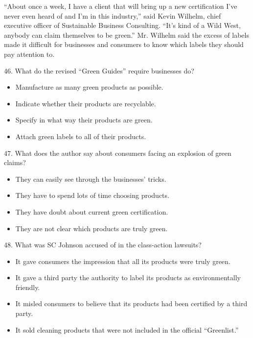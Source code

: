 \documentclass[UTF8,11pt]{ctexart}
\begin{document}
“About once a week, I have a client that will bring up a new certification I’ve never even heard of and I’m in this industry,” said Kevin Wilhelm, chief executive officer of Sustainable Business Consulting. “It’s kind of a Wild West, anybody can claim themselves to be green.” Mr. Wilhelm said the excess of labels made it difficult for businesses and consumers to know which labels they should pay attention to.


46. What do the revised “Green Guides” require businesses do?


\begin{itemize}[leftmargin=2em,itemsep=.2em,topsep=.4em]\item[A.] Manufacture as many green products as possible.
\item[B.] Indicate whether their products are recyclable.
\item[C.] Specify in what way their products are green.
\item[D.] Attach green labels to all of their products.
\end{itemize}

47. What does the author say about consumers facing an explosion of green claims?


\begin{itemize}[leftmargin=2em,itemsep=.2em,topsep=.4em]\item[A.] They can easily see through the businesses’ tricks.
\item[B.] They have to spend lots of time choosing products.
\item[C.] They have doubt about current green certification.
\item[D.] They are not clear which products are truly green.
\end{itemize}

48. What was SC Johnson accused of in the class-action lawsuits?


\begin{itemize}[leftmargin=2em,itemsep=.2em,topsep=.4em]\item[A.] It gave consumers the impression that all its products were truly green.
\item[B.] It gave a third party the authority to label its products as environmentally friendly.
\item[C.] It misled consumers to believe that its products had been certified by a third party.
\item[D.] It sold cleaning products that were not included in the official “Greenlist.”
\end{itemize}
\end{document}
